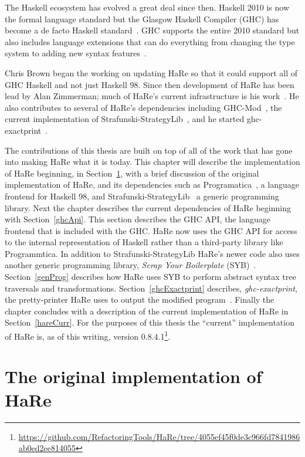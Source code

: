 	The Haskell ecosystem has evolved a great deal since then. Haskell 2010 is now the formal language standard but the Glasgow Haskell Compiler (GHC) has become a de facto Haskell standard~\citep{refacTools}. GHC supports the entire 2010 standard but also includes language extensions that can do everything from changing the type system to adding new syntax features~\citep{langExts}. 
	
	Chris Brown began the working on updating HaRe so that it could support all of GHC Haskell and not just Haskell 98. Since then development of HaRe has been lead by Alan Zimmerman; much of HaRe's current infrastructure is his work~\citep{hareCurrent}. He also contributes to several of HaRe's dependencies including GHC-Mod~\citep{ghcMod}, the current implementation of Strafunski-StrategyLib~\citep{strafunskiGit}, and he started ghc-exactprint~\citep{exactprint}.
	
	The contributions of this thesis are built on top of all of the work that has gone into making HaRe what it is today. This chapter will describe the implementation of HaRe beginning, in Section~\ref{hareOrig}, with a brief discussion of the original implementation of HaRe, and its dependencies such as Programatica~\citep{programatica}, a language frontend for Haskell 98, and Strafunski-StrategyLib~\citep{strafunski} a generic programming library. Next the chapter describes the current dependencies of HaRe beginning with Section~\ref{ghcApi}. This section describes the GHC API, the language frontend that is included with the GHC. HaRe now uses the GHC API for access to the internal representation of Haskell rather than a third-party library like Programmtica. In addition to Strafunski-StrategyLib HaRe's newer code also uses another generic programming library, \textit{Scrap Your Boilerplate} (SYB)~\citep{syb}. Section~\ref{genProg} describes how HaRe uses SYB to perform abstract syntax tree traversals and transformations. Section~\ref{ghcExactprint} describes, \textit{ghc-exactprint}, the pretty-printer HaRe uses to output the modified program~\citep{exactprint}. Finally the chapter concludes with a description of the current implementation of HaRe in Section~\ref{hareCurr}. For the purposes of this thesis the ``current'' implementation of HaRe is, as of this writing, version 0.8.4.1\footnote{\url{https://github.com/RefactoringTools/HaRe/tree/4055ef45f0de3c966fd7841986ab0ed2ee814055}}.

\section{The original implementation of HaRe}
\label{hareOrig}

